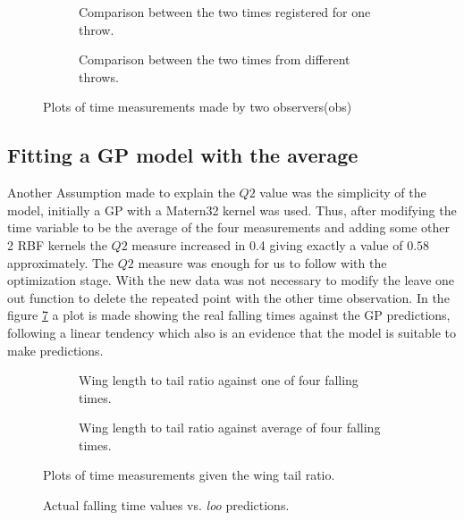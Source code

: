 \begin{figure}
	\begin{subfigure}[h]{.5\linewidth}
		
		\caption{Comparison between the two times registered for one throw.}
		\label{fig_EX1_EX1}
	\end{subfigure}
	\begin{subfigure}[h]{.5\linewidth}
		
		\caption{Comparison between the two times from different throws.}
		\label{fig_EX1_EX2}
	\end{subfigure}
	\caption{Plots of time measurements made by two observers(obs)}
\end{figure}

\subsection{Fitting a GP model with the average}

Another Assumption made to explain the $Q2$ value was the simplicity of the
model, initially a GP with a Matern32 kernel was used. Thus, after modifying
the time variable to be the average of the four measurements and adding some
other 2 RBF kernels the $Q2$ measure increased in 0.4 giving exactly a value of
$0.58$ approximately. The $Q2$ measure was enough for us to follow with the
optimization stage. With the new data was not necessary to modify the leave one
out function to delete the repeated point with the other time observation. In
the figure \ref{mloo_vs_real} a plot is made showing the real falling times
against the GP predictions, following a linear tendency which also is an
evidence that the model is suitable to make predictions.


\begin{figure}
	\begin{subfigure}[h]{.5\linewidth}
		
		\caption{Wing length to tail ratio against one of four falling times.}
		\label{fig_wtr_vs_obs2}
	\end{subfigure}
	\begin{subfigure}[h]{.5\linewidth}
		
		\caption{Wing length to tail ratio against average of four falling times.}
		\label{fig_wtr_vs_avg4}
	\end{subfigure}
	\caption{Plots of time measurements given the wing tail ratio.}
\end{figure}

\begin{figure}[h]
	\centering
	
	\caption{Actual falling time values vs. \emph{loo} predictions.}
	\label{mloo_vs_real}
\end{figure}

